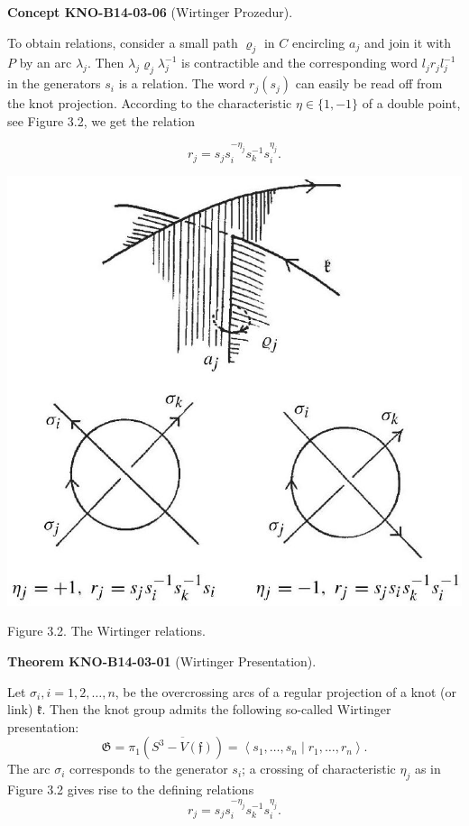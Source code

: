 \documentclass[10pt, letterpaper]{article}
\newcommand{\CustomHeading}[3]{%
  \par\medskip\noindent%
  \textbf{#1 #2} \textnormal{(#3)}.\enskip%
}
\newenvironment{THEO}[2]{\CustomHeading{Theorem}{#1}{#2}}{}
\newenvironment{CONC}[2]{\CustomHeading{Concept}{#1}{#2}}{}
\begin{document}
\begin{CONC}{KNO-B14-03-06}{Wirtinger Prozedur}
To obtain relations, consider a small path $\varrho_{j}$ in $C$ encircling $a_{j}$ and join it with $P$ by an arc $\lambda_{j}$. Then $\lambda_{j} \varrho_{j} \lambda_{j}^{-1}$ is contractible and the corresponding word $l_{j} r_{j} l_{j}^{-1}$ in the generators $s_{i}$ is a relation. The word $r_{j}\left(s_{j}\right)$ can easily be read off from the knot projection. According to the characteristic $\eta \in\{1,-1\}$ of a double point, see Figure 3.2, we get the relation

$$
r_{j}=s_{j} s_{i}^{-\eta_{j}} s_{k}^{-1} s_{i}^{\eta_{j}} .
$$

\begin{center}
\includegraphics[scale=0.2]{2025_05_21_9c06be8de7a55410f8c1g-047}
\end{center}
Figure 3.2. The Wirtinger relations.
\end{CONC}

\begin{THEO}{KNO-B14-03-01}{Wirtinger Presentation}
Let $\sigma_{i}, i=1,2, \ldots, n$, be the overcrossing arcs of a regular projection of a knot (or link) $\mathfrak{k}$. Then the knot group admits the following so-called Wirtinger presentation:
$$
\mathfrak{G}=\pi_{1}\left(\overline{S^{3}-V(\mathfrak{f})}\right)=\left\langle s_{1}, \ldots, s_{n} \mid r_{1}, \ldots, r_{n}\right\rangle .
$$
The arc $\sigma_{i}$ corresponds to the generator $s_{i}$; a crossing of characteristic $\eta_{j}$ as in Figure 3.2 gives rise to the defining relations
$$
r_{j}=s_{j} s_{i}^{-\eta_{j}} s_{k}^{-1} s_{i}^{\eta_{j}} .
$$
\end{THEO}
\end{document}
